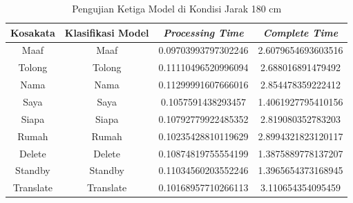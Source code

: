 \begin{longtable}{|c|c|c|c|}
  \caption{Pengujian Ketiga Model di Kondisi Jarak 180 cm}
  \label{tb:prediksipendek3}                                   \\
  \hline
  \rowcolor[HTML]{C0C0C0}
  \textbf{Kosakata} & \textbf{Klasifikasi Model} & \textbf{\emph{Processing Time}} & \textbf{\emph{Complete Time}}\\
  \hline
  Maaf              & Maaf                        & 0.09703993797302246                           & 2.6079654693603516                                  \\
  Tolong            & Tolong                        & 0.11110496520996094                           & 2.688016891479492                                  \\
  Nama              & Nama                        & 0.11299991607666016                           & 2.854478359222412                                  \\
  Saya              & Saya                        & 0.1057591438293457                           & 1.4061927795410156                                  \\
  Siapa              & Siapa                        & 0.10792779922485352                           & 2.819080352783203                                  \\
  Rumah             & Rumah                        & 0.10235428810119629                           & 2.8994321823120117                                  \\
  Delete            & Delete                        & 0.10874819755554199                           & 1.3875889778137207                                  \\
  Standby           & Standby                        & 0.11034560203552246                           & 1.3965654373168945                                  \\
  Translate         & Translate                        & 0.10168957710266113                           & 3.110654354095459                                  \\
  \hline
\end{longtable}

